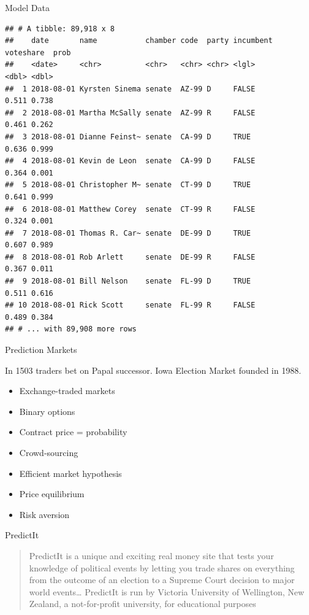 \documentclass[ignorenonframetext,]{beamer}
\providecommand{\tightlist}{%
  \setlength{\itemsep}{0pt}\setlength{\parskip}{0pt}}
\begin{document}
\begin{frame}[fragile]{Model Data}

\begin{verbatim}
## # A tibble: 89,918 x 8
##    date       name           chamber code  party incumbent voteshare  prob
##    <date>     <chr>          <chr>   <chr> <chr> <lgl>         <dbl> <dbl>
##  1 2018-08-01 Kyrsten Sinema senate  AZ-99 D     FALSE         0.511 0.738
##  2 2018-08-01 Martha McSally senate  AZ-99 R     FALSE         0.461 0.262
##  3 2018-08-01 Dianne Feinst~ senate  CA-99 D     TRUE          0.636 0.999
##  4 2018-08-01 Kevin de Leon  senate  CA-99 D     FALSE         0.364 0.001
##  5 2018-08-01 Christopher M~ senate  CT-99 D     TRUE          0.641 0.999
##  6 2018-08-01 Matthew Corey  senate  CT-99 R     FALSE         0.324 0.001
##  7 2018-08-01 Thomas R. Car~ senate  DE-99 D     TRUE          0.607 0.989
##  8 2018-08-01 Rob Arlett     senate  DE-99 R     FALSE         0.367 0.011
##  9 2018-08-01 Bill Nelson    senate  FL-99 D     TRUE          0.511 0.616
## 10 2018-08-01 Rick Scott     senate  FL-99 R     FALSE         0.489 0.384
## # ... with 89,908 more rows
\end{verbatim}

\end{frame}

\begin{frame}{Prediction Markets}

In 1503 traders bet on Papal successor. Iowa Election Market founded in
1988.

\begin{itemize}
\tightlist
\item
  Exchange-traded markets
\item
  Binary options
\item
  Contract price = probability
\item
  Crowd-sourcing
\item
  Efficient market hypothesis
\item
  Price equilibrium
\item
  Risk aversion
\end{itemize}

\end{frame}

\begin{frame}{PredictIt}

\begin{quote}
PredictIt is a unique and exciting real money site that tests your
knowledge of political events by letting you trade shares on everything
from the outcome of an election to a Supreme Court decision to major
world events\ldots{} PredictIt is run by Victoria University of
Wellington, New Zealand, a not-for-profit university, for educational
purposes
\end{quote}

\end{frame}
\end{document}
